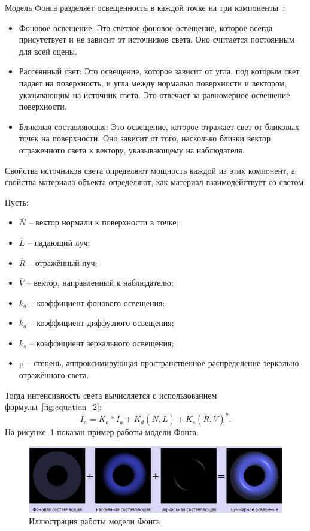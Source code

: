 Модель Фонга разделяет освещенность в каждой точке на три компоненты~\cite{lambert}:
\begin{itemize}
	\item Фоновое освещение: Это светлое фоновое освещение, которое всегда присутствует и не зависит от источников света. Оно считается постоянным для всей сцены.
	\item Рассеянный свет: Это освещение, которое зависит от угла, под которым свет падает на поверхность, и угла между нормалью поверхности и вектором, указывающим на источник света. Это отвечает за равномерное освещение поверхности.
	\item Бликовая составляющая: Это освещение, которое отражает свет от бликовых точек на поверхности. Оно зависит от того, насколько близки вектор отраженного света к вектору, указывающему на наблюдателя.
\end{itemize}

Свойства источников света определяют мощность каждой из этих компонент, а свойства материала объекта определяют, как материал взаимодействует со светом.

Пусть: 

\begin{itemize}
	\item $\overline{N}$ – вектор нормали к поверхности в точке;	
	\item $\overline{L}$ – падающий луч;
	\item $\overline{R}$ – отражённый луч; 
	\item $\overline{V}$ – вектор, направленный к наблюдателю; 
	\item $k_a$ – коэффициент фонового освещения;
	\item $k_d$ – коэффициент диффузного освещения;
	\item $k_s$ – коэффициент зеркального освещения; 
	\item p – степень, аппроксимирующая пространственное распределение зеркально отражённого света.  	
\end{itemize}
Тогда интенсивность света вычисляется с использованием формулы~\ref{fig:equation_2}:
\begin{equation}
	I_a = K_a * I_a + K_d(\overline{N}, \overline{L}) +  K_s(\overline{R}, \overline{V})^p.
	\label{fig:equation_2}
\end{equation}
На рисунке~\ref{fig:fongo1} показан пример работы модели Фонга:
\begin{figure}[h]
	\begin{center}
		\includegraphics[width=\linewidth]{photos/fonga.png}
	\end{center}
	\caption{Иллюстрация работы модели Фонга}
	\label{fig:fongo1}
\end{figure}

